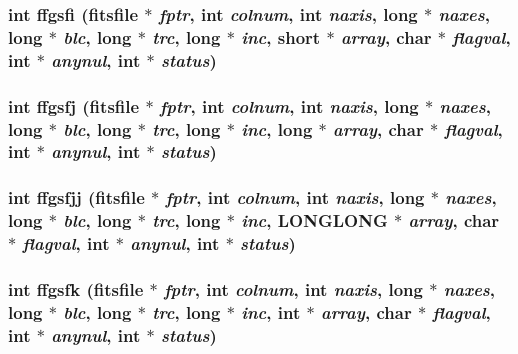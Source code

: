 \subsubsection{\setlength{\rightskip}{0pt plus 5cm}int ffgsfi (\bf{fitsfile} $\ast$ {\em fptr}, int {\em colnum}, int {\em naxis}, long $\ast$ {\em naxes}, long $\ast$ {\em blc}, long $\ast$ {\em trc}, long $\ast$ {\em inc}, short $\ast$ {\em array}, char $\ast$ {\em flagval}, int $\ast$ {\em anynul}, int $\ast$ {\em status})}\label{test_2roimasker_2fitsio_8h_64fe61a10be1e4a7891e611c2367811a}


\subsubsection{\setlength{\rightskip}{0pt plus 5cm}int ffgsfj (\bf{fitsfile} $\ast$ {\em fptr}, int {\em colnum}, int {\em naxis}, long $\ast$ {\em naxes}, long $\ast$ {\em blc}, long $\ast$ {\em trc}, long $\ast$ {\em inc}, long $\ast$ {\em array}, char $\ast$ {\em flagval}, int $\ast$ {\em anynul}, int $\ast$ {\em status})}\label{test_2roimasker_2fitsio_8h_5fe7f8cf0ec4c375a0d8883974df5e3f}


\subsubsection{\setlength{\rightskip}{0pt plus 5cm}int ffgsfjj (\bf{fitsfile} $\ast$ {\em fptr}, int {\em colnum}, int {\em naxis}, long $\ast$ {\em naxes}, long $\ast$ {\em blc}, long $\ast$ {\em trc}, long $\ast$ {\em inc}, \bf{LONGLONG} $\ast$ {\em array}, char $\ast$ {\em flagval}, int $\ast$ {\em anynul}, int $\ast$ {\em status})}\label{test_2roimasker_2fitsio_8h_928fae8967c2f8fbbd25314487385b55}


\subsubsection{\setlength{\rightskip}{0pt plus 5cm}int ffgsfk (\bf{fitsfile} $\ast$ {\em fptr}, int {\em colnum}, int {\em naxis}, long $\ast$ {\em naxes}, long $\ast$ {\em blc}, long $\ast$ {\em trc}, long $\ast$ {\em inc}, int $\ast$ {\em array}, char $\ast$ {\em flagval}, int $\ast$ {\em anynul}, int $\ast$ {\em status})}\label{test_2roimasker_2fitsio_8h_0efb49c901a562ffccd69c4c87c47387}


